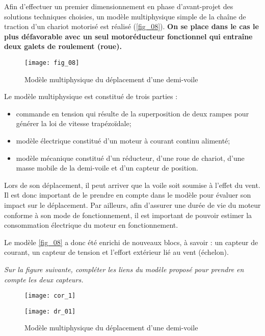 Afin d’effectuer un premier dimensionnement en phase d’avant-projet des solutions
techniques choisies, un modèle multiphysique simple de la chaîne de traction d’un chariot motorisé est réalisé
(\autoref{fig_08}).
\textbf{On se place dans le cas le plus défavorable avec un seul motoréducteur fonctionnel qui entraîne
deux galets de roulement (roue).}


\begin{figure}[H]
\centering
\texttt{[image: fig\_08]}
\caption{Modèle multiphysique du déplacement d’une demi-voile \label{fig_08}}
\end{figure}

Le modèle multiphysique est constitué de trois parties :
\begin{itemize}
\item commande en tension qui résulte de la superposition de deux rampes pour générer la loi de vitesse trapézoïdale;
\item modèle électrique constitué d’un moteur à courant continu alimenté;%
\item modèle mécanique constitué d’un réducteur, d’une roue de chariot, d’une masse mobile de la demi-voile et
d’un capteur de position.
\end{itemize}


%

Lors de son déplacement, il peut arriver que la voile soit soumise à l’effet du vent. Il est donc important de
le prendre en compte dans le modèle pour évaluer son impact sur le déplacement. Par ailleurs, afin d’assurer
une durée de vie du moteur conforme à son mode de fonctionnement, il est important de pouvoir estimer la
consommation électrique du moteur en fonctionnement.

Le modèle \autoref{fig_08} a donc été enrichi de nouveaux blocs, à savoir : un capteur de courant, un capteur de tension
et l’effort extérieur lié au vent (échelon).
\fi


\question{\label{q5}}\textit{Sur la figure suivante, compléter les liens du modèle proposé pour prendre en compte
les deux capteurs.}
\ifprof
\begin{corrige}
\begin{figure}[H]
\centering
\texttt{[image: cor\_1]}
\end{figure}
\end{corrige}
\else
\fi

\ifprof
\else
\begin{figure}[H]
\centering
\texttt{[image: dr\_01]}
\caption{Modèle multiphysique du déplacement d’une demi-voile \label{dr_01}}
\end{figure}

\fi
